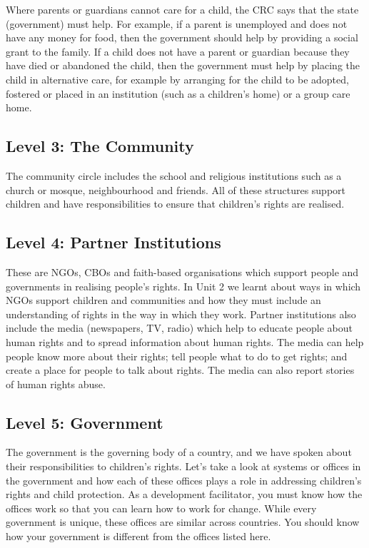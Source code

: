 \documentclass[12pt,a4paper]{article}
\begin{document}
Where parents or guardians cannot care for a child, the CRC says that the state (government) must help. For example, if a parent is unemployed and does not have any money for food, then the government should help by providing a social grant to the family. If a child does not have a parent or guardian because they have died or abandoned the child, then the government must help by placing the child in alternative care, for example by arranging for the child to be adopted, fostered or placed in an institution (such as a children’s home) or a group care home.

\subsection*{Level 3: The Community}
The community circle includes the school and religious institutions such as a church or mosque, neighbourhood and friends. All of these structures support children and have responsibilities to ensure that children’s rights are realised.

\subsection*{Level 4: Partner Institutions}
These are NGOs, CBOs and faith-based organisations which support people and governments in realising people’s rights. In Unit 2 we learnt about ways in which NGOs support children and communities and how they must include an understanding of rights in the way in which they work. Partner institutions also include the media (newspapers, TV, radio) which help to educate people about human rights and to spread information about human rights. The media can help people know more about their rights; tell people what to do to get rights; and create a place for people to talk about rights. The media can also report stories of human rights abuse.

\subsection*{Level 5: Government}
The government is the governing body of a country, and we have spoken about their responsibilities to children’s rights. Let’s take a look at systems or offices in the government and how each of these offices plays a role in addressing children’s rights and child protection. As a development facilitator, you must know how the offices work so that you can learn how to work for change. While every government is unique, these offices are similar across countries. You should know how your government is different from the offices listed here.
\end{document}
